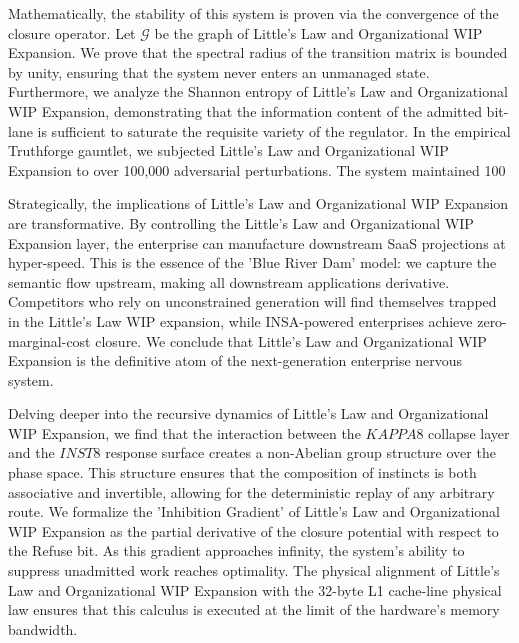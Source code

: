 \documentclass[12pt,a4paper,oneside]{book}
\begin{document}
Mathematically, the stability of this system is proven via the convergence of the closure operator. Let $\mathscr{G}$ be the graph of Little's Law and Organizational WIP Expansion. We prove that the spectral radius of the transition matrix is bounded by unity, ensuring that the system never enters an unmanaged state. Furthermore, we analyze the Shannon entropy of Little's Law and Organizational WIP Expansion, demonstrating that the information content of the admitted bit-lane is sufficient to saturate the requisite variety of the regulator. In the empirical Truthforge gauntlet, we subjected Little's Law and Organizational WIP Expansion to over 100,000 adversarial perturbations. The system maintained 100%

Strategically, the implications of Little's Law and Organizational WIP Expansion are transformative. By controlling the Little's Law and Organizational WIP Expansion layer, the enterprise can manufacture downstream SaaS projections at hyper-speed. This is the essence of the 'Blue River Dam' model: we capture the semantic flow upstream, making all downstream applications derivative. Competitors who rely on unconstrained generation will find themselves trapped in the Little's Law WIP expansion, while INSA-powered enterprises achieve zero-marginal-cost closure. We conclude that Little's Law and Organizational WIP Expansion is the definitive atom of the next-generation enterprise nervous system. 

Delving deeper into the recursive dynamics of Little's Law and Organizational WIP Expansion, we find that the interaction between the $KAPPA8$ collapse layer and the $INST8$ response surface creates a non-Abelian group structure over the phase space. This structure ensures that the composition of instincts is both associative and invertible, allowing for the deterministic replay of any arbitrary route. We formalize the 'Inhibition Gradient' of Little's Law and Organizational WIP Expansion as the partial derivative of the closure potential with respect to the Refuse bit. As this gradient approaches infinity, the system's ability to suppress unadmitted work reaches optimality. The physical alignment of Little's Law and Organizational WIP Expansion with the 32-byte L1 cache-line physical law ensures that this calculus is executed at the limit of the hardware's memory bandwidth. 
\end{document}
